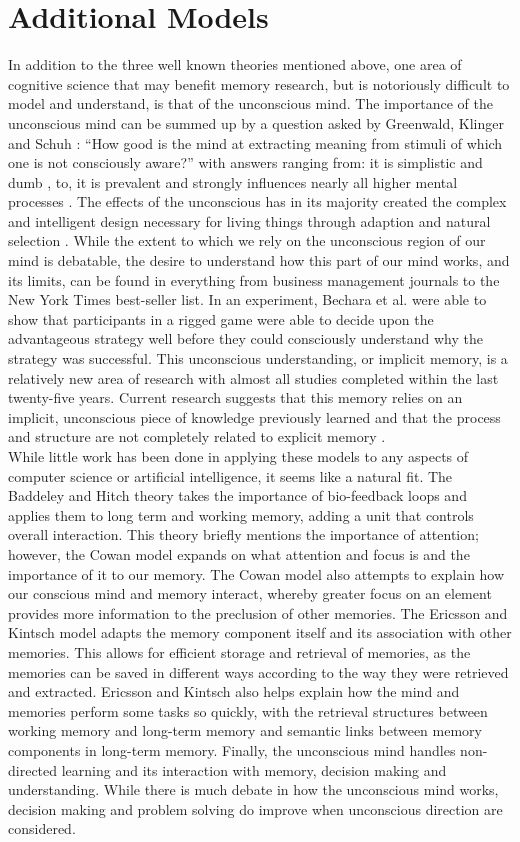\section{Additional Models}
In addition to the three well known theories mentioned above, one area of cognitive science that may benefit memory research, but is notoriously difficult to model and understand, is that of the unconscious mind. The importance of the unconscious mind can be summed up by a question asked by Greenwald, Klinger and Schuh \cite{SUBQUESTION}: ``How good is the mind at extracting meaning from stimuli of which one is not consciously aware?'' with answers ranging from: it is simplistic and dumb \cite{DUMBUNCONSCIOUS}, to, it is prevalent and strongly influences nearly all higher mental processes \cite{SMARTUNCONSCIOUS}. The effects of the unconscious has in its majority created the complex and intelligent design necessary for living things through adaption and natural selection \cite{UnconsciousMind}.  While the extent to which we rely on the unconscious region of our mind is debatable, the desire to understand how this part of our mind works, and its limits, can be found in everything from business management journals to the New York Times best-seller list. In an experiment, Bechara et al.\cite{Bechara} were able to show that participants in a rigged game were able to decide upon the advantageous strategy well before they could consciously understand why the strategy was successful. This unconscious understanding, or implicit memory, is a relatively new area of research with almost all studies completed within the last twenty-five years. Current research suggests that this memory relies on an implicit, unconscious piece of knowledge previously learned and that the process and structure are not completely related to explicit memory \cite{ImplicitMem}.
\\
While little work has been done in applying these models to any aspects of computer science or artificial intelligence, it seems like a natural fit.  The Baddeley and Hitch theory takes the importance of bio-feedback loops and applies them to long term and working memory, adding a unit that controls overall interaction.  This theory briefly mentions the importance of attention; however, the Cowan model expands on what attention and focus is and the importance of it to our memory.  The Cowan model also attempts to explain how our conscious mind and memory interact, whereby greater focus on an element provides more information to the preclusion of other memories. The Ericsson and Kintsch model adapts the memory component itself and its association with other memories. This allows for efficient storage and retrieval of memories, as the memories can be saved in different ways according to the way they were retrieved and extracted.  Ericsson and Kintsch also helps explain how the mind and memories perform some tasks so quickly, with the retrieval structures between working memory and long-term memory and semantic links between memory components in long-term memory. Finally, the unconscious mind handles non-directed learning and its interaction with memory, decision making and understanding. While there is much debate in how the unconscious mind works, decision making and problem solving do improve when unconscious direction are considered.
